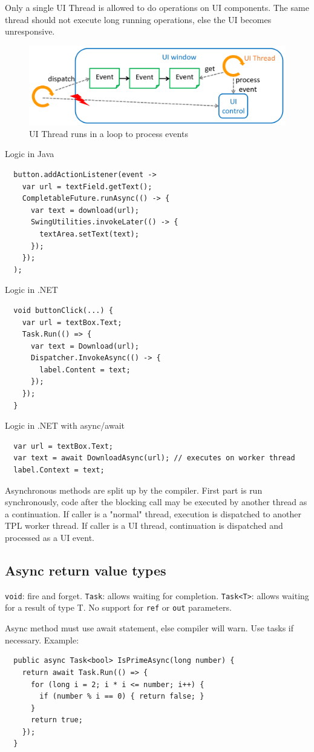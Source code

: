 Only a single UI Thread is allowed to do operations on UI components. The same thread should not execute long running operations, else the UI becomes unresponsive.

\begin{figure}[H]
  \centering
  \includegraphics[width=12cm]{res/06-ui-thread-loop.png}
  \caption{UI Thread runs in a loop to process events}
\end{figure}

Logic in Java
\begin{lstlisting}
  button.addActionListener(event ->
    var url = textField.getText();
    CompletableFuture.runAsync(() -> {
      var text = download(url);
      SwingUtilities.invokeLater(() -> {
        textArea.setText(text);
      });
    });
  );
\end{lstlisting}

Logic in .NET
\begin{lstlisting}
  void buttonClick(...) {
    var url = textBox.Text;
    Task.Run(() => {
      var text = Download(url);
      Dispatcher.InvokeAsync(() -> {
        label.Content = text;
      });
    });
  }
\end{lstlisting}

Logic in .NET with async/await
\begin{lstlisting}
  var url = textBox.Text;
  var text = await DownloadAsync(url); // executes on worker thread
  label.Context = text;
\end{lstlisting}

Asynchronous methods are split up by the compiler. First part is run synchronously, code after the blocking call may be executed by another thread as a continuation.
If caller is a "normal" thread, execution is dispatched to another TPL worker thread. 
If caller is a UI thread, continuation is dispatched and processed as a UI event.

\subsection*{Async return value types}
\texttt{void}: fire and forget. 
\texttt{Task}: allows waiting for completion. 
\texttt{Task<T>}: allows waiting for a result of type T.
No support for \texttt{ref} or \texttt{out} parameters.

\vspace{3mm}
Async method must use await statement, else compiler will warn. Use tasks if necessary. Example:

\begin{lstlisting}
  public async Task<bool> IsPrimeAsync(long number) {
    return await Task.Run(() => {
      for (long i = 2; i * i <= number; i++) {
        if (number % i == 0) { return false; }
      }
      return true;
    });
  }
\end{lstlisting}